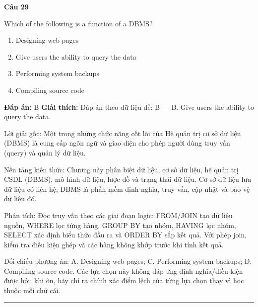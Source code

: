 \documentclass[11pt,a4paper]{article}
\newenvironment{question}[1]{%
  \par\vspace{1em}\noindent\textbf{\large Câu #1}\par\vspace{0.4em}
}{%
  \par\vspace{1em}\hrule\vspace{0.6em}
}
\newenvironment{choices}{%
  \begin{enumerate}[label=\textbf{\Alph*.},leftmargin=2.2em,itemsep=2pt,topsep=3pt]
}{%
  \end{enumerate}
}
\newcommand{\choice}{\item}
\begin{document}
\begin{question}{29}
Which of the following is a function of a DBMS?
\begin{choices}
\choice Designing web pages
\choice Give users the ability to query the data
\choice Performing system backups
\choice Compiling source code
\end{choices}
\textbf{Đáp án:} B
\textbf{Giải thích:} Đáp án theo dữ liệu đề: B — B. Give users the ability to query the data.

Lời giải gốc: Một trong những chức năng cốt lõi của Hệ quản trị cơ sở dữ liệu (DBMS) là cung cấp ngôn ngữ và giao diện cho phép người dùng truy vấn (query) và quản lý dữ liệu.

Nền tảng kiến thức: Chương này phân biệt dữ liệu, cơ sở dữ liệu, hệ quản trị CSDL (DBMS), mô hình dữ liệu, lược đồ và trạng thái dữ liệu. Cơ sở dữ liệu lưu dữ liệu có liên hệ; DBMS là phần mềm định nghĩa, truy vấn, cập nhật và bảo vệ dữ liệu đó.

Phân tích: Đọc truy vấn theo các giai đoạn logic: FROM/JOIN tạo dữ liệu nguồn, WHERE lọc từng hàng, GROUP BY tạo nhóm, HAVING lọc nhóm, SELECT xác định biểu thức đầu ra và ORDER BY sắp kết quả. Với phép join, kiểm tra điều kiện ghép và các hàng không khớp trước khi tính kết quả.

Đối chiếu phương án: A. Designing web pages; C. Performing system backups; D. Compiling source code. Các lựa chọn này không đáp ứng định nghĩa/điều kiện được hỏi; khi ôn, hãy chỉ ra chính xác điểm lệch của từng lựa chọn thay vì học thuộc mỗi chữ cái.
\end{question}
\end{document}
